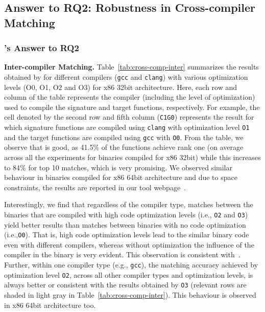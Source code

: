 
\subsection{Answer to RQ2: Robustness in Cross-compiler Matching}\label{sec:evaluation_rq2}
\subsubsection{\tool's Answer to RQ2}

\textbf{Inter-compiler Matching.} Table~\ref{tab:cross-comp-inter} summarizes the results obtained by \tool for different compilers (\texttt{gcc} and \texttt{clang}) with various optimization levels (O0, O1, O2 and O3) for x86 32bit architecture.
Here, each row and column of the table represents the compiler (including the level of optimization) used to compile the signature and target functions, respectively.
For example, the cell denoted by the second row and fifth column (\texttt{C1G0}) represents the result for which signature functions are compiled using \texttt{clang}  with optimization level \texttt{O1} and the target functions are compiled using \texttt{gcc} with  \texttt{O0}.
From the table, we observe that \tool is good, %
as 41.5\% of the functions achieve rank one (on average across all the experiments for binaries compiled for x86 32bit) while this increases to 84\% for top 10 matches, which is very promising. We observed similar behaviour in binaries compiled for x86 64bit architecture and due to space constraints, the results are reported in our tool webpage~\cite{bingo@fse2016}.%

Interestingly, we find that regardless of the compiler type, matches between the binaries that are compiled with high code optimization levels (i.e., \texttt{O2} and \texttt{O3}) yield better results than matches between binaries with no code optimization (i.e.,\texttt{O0}). That is, high code optimization levels lead to the similar binary code even with different compilers, whereas without optimization the  influence of the compiler in the binary is very evident. This observation is consistent with~\cite{DBLP:conf/sp/PewnyGGRH15}. Further, within one compiler type (e.g., \texttt{gcc}), the matching accuracy achieved by optimization level \texttt{O2}, across all other compiler types and optimization levels, is always better or consistent with the results obtained by \texttt{O3} (relevant rows are shaded in light gray in Table~\ref{tab:cross-comp-inter}). This behaviour is observed in x86 64bit architecture too.



